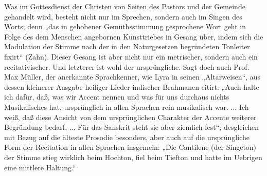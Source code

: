 Was im Gottesdienst der Christen von Seiten des Pastors und der Gemeinde gehandelt wird, besteht nicht nur im Sprechen, sondern auch im Singen des Worts; denn „das in gehobener Gemüthsstimmung gesprochene Wort geht in Folge des dem Menschen angebornen Kunsttriebes in Gesang über, indem sich die Modulation der Stimme nach der in den Naturgesetzen begründeten Tonleiter fixirt“ (Zahn). Dieser Gesang ist aber nicht nur ein metrischer, sondern auch ein recitativischer. Und letzterer ist wohl der ursprüngliche. Sagt doch auch Prof. Max Müller, der anerkannte Sprachkenner, wie
Lyra in seinen „Altarweisen“, aus dessen kleinerer Ausgabe heiliger Lieder indischer Brahmanen citirt: „Auch halte ich dafür, daß, was wir Accent nennen und was für uns durchaus nichts Musikalisches hat, ursprünglich in allen Sprachen rein musikalisch war. ... Ich weiß, daß diese Ansicht von dem ursprünglichen Charakter der Accente weiterer Begründung bedarf. ... Für das Sanskrit steht sie aber ziemlich fest“; desgleichen mit Bezug auf die älteste Prosodie besonders, aber auch auf die ursprüngliche Form der Recitation in allen Sprachen insgemein: „Die Cantilene (der Singeton) der Stimme stieg wirklich beim Hochton, fiel beim Tiefton und hatte im Uebrigen eine mittlere Haltung.“


